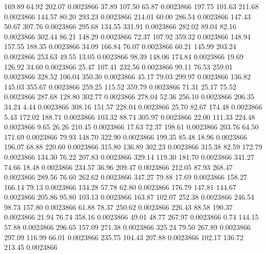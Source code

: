     169.89     64.92    202.07  0.0023866
     37.89    107.50     65.87  0.0023866
    197.75    101.63    211.68  0.0023866
    144.57     80.20    293.23  0.0023866
    214.01     60.00    286.54  0.0023866
    147.43     50.67    307.76  0.0023866
    295.68    134.55    331.91  0.0023866
    282.02     89.04     82.16  0.0023866
    302.44     86.21    148.29  0.0023866
     72.37    107.92    359.32  0.0023866
    148.94    157.55    188.35  0.0023866
     34.09    166.84     76.07  0.0023866
     60.21    145.99    203.24  0.0023866
    253.63     49.55     13.05  0.0023866
     98.39    148.06    174.84  0.0023866
     19.69    126.92     34.60  0.0023866
     25.47    107.41    232.56  0.0023866
     99.11     76.53    259.01  0.0023866
    328.52    106.04    350.30  0.0023866
     45.17     79.03    299.97  0.0023866
    136.82    145.03    355.67  0.0023866
    259.25    115.52    359.79  0.0023866
     71.31     25.17     75.52  0.0023866
    287.68    128.80    302.77  0.0023866
    278.04     52.36    256.10  0.0023866
    206.35     34.24      4.44  0.0023866
    308.16    151.57    228.04  0.0023866
     25.70     82.67    174.48  0.0023866
      5.43    172.02    188.71  0.0023866
    103.32     88.74    305.97  0.0023866
     22.00    111.33    224.48  0.0023866
      9.65     26.26    210.45  0.0023866
     17.63     72.37    198.61  0.0023866
    203.76     64.50    171.69  0.0023866
     79.93    148.70    322.90  0.0023866
    199.35     85.48     18.96  0.0023866
    196.07     68.88    220.60  0.0023866
    315.80    136.89    302.23  0.0023866
    315.38     82.59    172.79  0.0023866
    134.30     76.22    207.83  0.0023866
    329.14    119.30    181.70  0.0023866
    341.27     74.66     18.48  0.0023866
    234.57     36.96    209.47  0.0023866
    212.05     87.93    268.47  0.0023866
    289.56     76.60    262.62  0.0023866
    347.27     79.88     17.69  0.0023866
    158.27    166.14     79.13  0.0023866
    134.28     57.78     62.80  0.0023866
    176.79    147.81    144.67  0.0023866
    205.86     95.80    103.13  0.0023866
    163.87    102.07    252.38  0.0023866
    246.54     98.73    157.80  0.0023866
     61.88     78.37    250.62  0.0023866
    226.43     88.58    190.37  0.0023866
     21.94     76.74    358.16  0.0023866
     49.01     48.77    267.97  0.0023866
      0.74    144.15     57.88  0.0023866
    296.65    157.09    271.38  0.0023866
    325.24     79.50    267.89  0.0023866
    297.09    116.99     66.01  0.0023866
    235.75    104.43    207.88  0.0023866
    102.17    136.72    213.45  0.0023866
